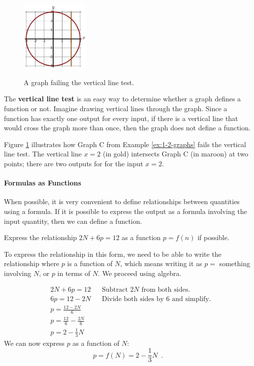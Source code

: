 \begin{figure}
    \centering
    \vspace{-12pt}
    \includegraphics[width=0.3\textwidth]{img/chap1/sec1-2/fig115.png}\\
    \caption{A graph failing the vertical line test.}
    \label{fig:1-2-115}
\end{figure}
The \textbf{vertical line test} is an easy way to determine whether a graph defines a function or not. Imagine drawing vertical lines through the graph. Since a function has exactly one output for every input, if there is a vertical line that would cross the graph more than once, then the graph does not define a function.

Figure \ref{fig:1-2-115} illustrates how Graph C from Example \ref{ex:1-2-graphs} fails the vertical line test. The vertical line $x=2$ (in gold) intersects Graph C (in maroon) at two points; there are two outputs for for the input $x=2$.

\paragraph{Formulas as Functions}

When possible, it is very convenient to define relationships between quantities using a formula. If it is possible to express the output as a formula involving the input quantity, then we can define a function.

\begin{example}
Express the relationship $2N + 6p = 12$ as a function $p = f(n)$ if possible.

\begin{solution} To express the relationship in this form, we need to be able to write
the relationship where $p$ is a function of $N$, which means
writing it as $p = $ something involving $N$, or $p$ in terms of $N$. We proceed using algebra.

\begin{align*}
&2N + 6p = 12& &\mbox{Subtract $2N$ from both sides.}\\
&6p = 12 - 2N& &\mbox{Divide both sides by 6 and simplify.}\\
&p = \frac{12-2N}{6}& & \\
&p = \frac{12}{6} - \frac{2N}{6} & &\\
&p = 2 - \frac{1}{3}N & &
\end{align*}
We can now express $p$ as a function of $N$:
$$p = f(N) = 2 - \frac{1}{3}N \enspace .$$
\end{solution}\end{example}

